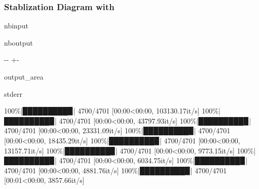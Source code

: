 \documentclass[letterpaper,10pt,english]{sphinxmanual}
\begin{document}
\subsubsection{Stablization Diagram with }
\label{\detokenize{examples/00_Overview:Stablization-Diagram-with-stabilization()}}
\begin{sphinxuseclass}{nbinput}
{
\begin{sphinxVerbatim}[commandchars=\\\{\}]
\llap{\color{nbsphinxin}[13]:\,\hspace{\fboxrule}\hspace{\fboxsep}}   
  \PYG{p}{[}\PYG{p}{]}\PYG{p}{[}\PYG{p}{]}  
\end{sphinxVerbatim}
}

\end{sphinxuseclass}
\begin{sphinxuseclass}{nboutput}
{

\kern-\sphinxverbatimsmallskipamount\kern-\baselineskip
\kern+\FrameHeightAdjust\kern-\fboxrule
\vspace{\nbsphinxcodecellspacing}

\begin{sphinxuseclass}{output_area}
\begin{sphinxuseclass}{stderr}


\begin{sphinxVerbatim}[commandchars=\\\{\}]
100\%|█████████▉| 4700/4701 [00:00<00:00, 103130.17it/s]
100\%|█████████▉| 4700/4701 [00:00<00:00, 43797.93it/s]
100\%|█████████▉| 4700/4701 [00:00<00:00, 23331.09it/s]
100\%|█████████▉| 4700/4701 [00:00<00:00, 18435.29it/s]
100\%|█████████▉| 4700/4701 [00:00<00:00, 13157.71it/s]
100\%|█████████▉| 4700/4701 [00:00<00:00, 9773.15it/s]
100\%|█████████▉| 4700/4701 [00:00<00:00, 6034.75it/s]
100\%|█████████▉| 4700/4701 [00:00<00:00, 4881.76it/s]
100\%|█████████▉| 4700/4701 [00:01<00:00, 3857.66it/s]
\end{sphinxVerbatim}



\end{sphinxuseclass}
\end{sphinxuseclass}
}

\end{sphinxuseclass}
\end{document}
